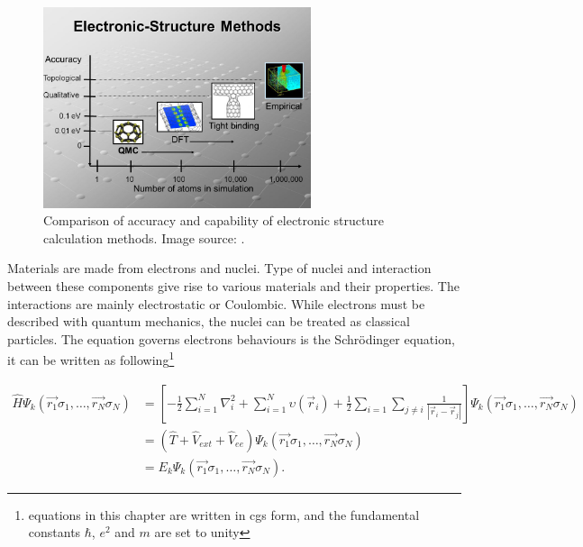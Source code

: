 \begin{figure}[htbp!] 
\centering  
\includegraphics[width=0.7\textwidth]{dft1.jpg}
\caption{ Comparison of accuracy and capability of electronic structure calculation methods. Image source: \cite{dft_ac}.}  
\label{fig:dft_ac}
\end{figure} 

Materials are made from electrons and nuclei. Type of nuclei and interaction between these components give rise to various materials and their properties. The interactions are mainly electrostatic or Coulombic. While electrons must be described with quantum mechanics, the nuclei can be treated as classical particles. The equation governs electrons behaviours is the Schrödinger equation, it can be written as following\footnote{equations in this chapter are written in cgs form, and the fundamental constants $\hbar$, $e^2$ and $m$ are set to unity}

\begin{equation}
\begin{aligned}
\hat{H}\mathit{\Psi}_k(\vec{r_1}\sigma_1,\ldots,\vec{r_N}\sigma_N) &=\left[ -\frac{1}{2}\sum^N_{i=1}\nabla_i^2+\sum^N_{i=1}\upsilon(\vec{r}_i)+\frac{1}{2}\sum_{i=1}\sum_{j\neq i}\frac{1}{|\vec{r}_i-\vec{r}_j|}\right]\mathit{\Psi}_k(\vec{r_1}\sigma_1,\ldots,\vec{r_N}\sigma_N)  \\
&=\left( \hat{T} + \hat{V}_{ext} + \hat{V}_{ee}\right)\mathit{\Psi}_k(\vec{r_1}\sigma_1,\ldots,\vec{r_N}\sigma_N) \\
&=E_k\mathit{\Psi}_k(\vec{r_1}\sigma_1,\ldots,\vec{r_N}\sigma_N) .
\end{aligned}
\end{equation}

